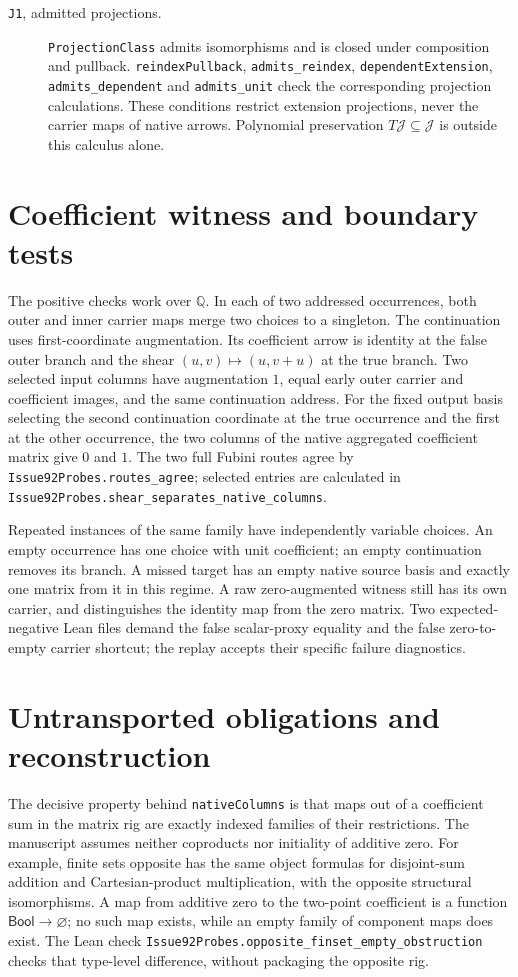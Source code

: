 \documentclass[11pt]{article}
\begin{document}
\begin{description}
\item[\texttt{J1}, admitted projections.]
\verb|ProjectionClass| admits isomorphisms and is closed under composition
and pullback. \verb|reindexPullback|, \verb|admits_reindex|,
\verb|dependentExtension|, \verb|admits_dependent| and \verb|admits_unit|
check the corresponding projection calculations. These conditions restrict
extension projections, never the carrier maps of native arrows.
Polynomial preservation $T\mathcal J\subseteq\mathcal J$ is outside this
calculus alone.
\end{description}

\section*{Coefficient witness and boundary tests}
The positive checks work over $\mathbb{Q}$. In each of two addressed
occurrences, both outer and inner carrier maps merge two choices to a
singleton. The continuation uses first-coordinate augmentation.
Its coefficient arrow is identity at the false outer branch and the
shear $(u,v)\mapsto(u,v+u)$ at the true branch. Two selected input columns
have augmentation $1$, equal early outer carrier and coefficient images,
and the same continuation address. For the fixed output basis selecting
the second continuation coordinate at the true occurrence and the first
at the other occurrence, the two columns of the native aggregated
coefficient matrix give $0$ and $1$. The two full Fubini routes agree by
\verb|Issue92Probes.routes_agree|; selected entries are calculated in
\verb|Issue92Probes.shear_separates_native_columns|.

Repeated instances of the same family have independently variable choices.
An empty occurrence has one choice with unit coefficient; an empty
continuation removes its branch. A missed target has an empty native
source basis and exactly one matrix from it in this regime. A raw
zero-augmented witness still has its own carrier, and distinguishes the
identity map from the zero matrix. Two expected-negative Lean files demand
the false scalar-proxy equality and the false zero-to-empty carrier shortcut;
the replay accepts their specific failure diagnostics.

\section*{Untransported obligations and reconstruction}
The decisive property behind \verb|nativeColumns| is that maps out of
a coefficient sum in the matrix rig are exactly indexed families of their
restrictions. The manuscript assumes neither coproducts nor initiality of
additive zero. For example, finite sets opposite has the same object
formulas for disjoint-sum addition and Cartesian-product multiplication,
with the opposite structural isomorphisms. A map from additive zero to
the two-point coefficient is a function $\mathsf{Bool}\to\varnothing$;
no such map exists, while an empty family of component maps does exist.
The Lean check \verb|Issue92Probes.opposite_finset_empty_obstruction|
checks that type-level difference, without packaging the opposite rig.
\end{document}
